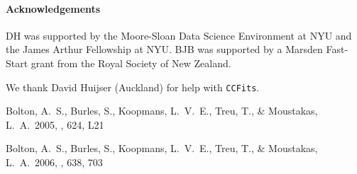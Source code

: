\documentclass[12pt]{emulateapj}
\begin{document}
\paragraph{Acknowledgements}
DH was supported by the Moore-Sloan Data Science Environment at NYU and the James Arthur Fellowship at NYU.
BJB was supported by a Marsden Fast-Start grant from the Royal Society of
New Zealand.

We thank David Huijser (Auckland) for help with {\tt CCFits}.



\begin{thebibliography}{999}

 Bolton, A.~S., Burles, 
S., Koopmans, L.~V.~E., Treu, T., 
\& Moustakas, L.~A.\ 2005, \apjl, 624, L21 

 Bolton, A.~S., Burles, 
S., Koopmans, L.~V.~E., Treu, T., \& Moustakas, L.~A.\ 2006, \apj, 638, 703 

\end{thebibliography}
\end{document}
